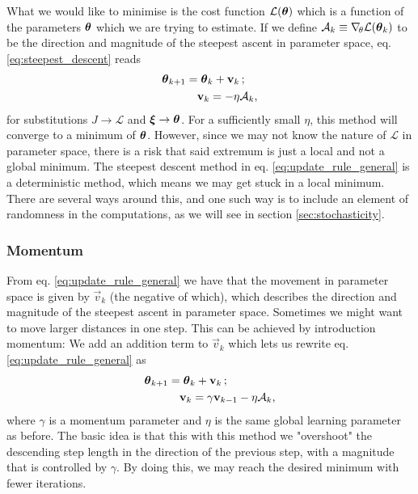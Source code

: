         What we would like to minimise is the cost function $\mathcal{L}(\boldsymbol{\theta})$ which is a function of the parameters $\boldsymbol{\theta}$ which we are trying to estimate. If we define $\mathcal{A}_k \equiv \nabla_{\!\theta} \mathcal{L}(\boldsymbol{\theta}_k)$ to be the direction and magnitude of the steepest ascent in parameter space, eq. \eqref{eq:steepest_descent} reads 
        \begin{equation}\label{eq:update_rule_general}
            \begin{split}
                \boldsymbol{\theta}_{k+1} &= \boldsymbol{\theta}_k + \mathbf{v}_k\,;  \\
                &\quad \mathbf{v}_k = -\eta\mathcal{A}_k,
            \end{split}
        \end{equation}
        for substitutions $J\to\mathcal{L}$ and $\boldsymbol{\xi}\to \boldsymbol{\theta}$. For a sufficiently small $\eta$, this method will converge to a minimum of $\boldsymbol{\theta}$. However, since we may not know the nature of $\mathcal{L}$ in parameter space, there is a risk that said extremum is just a local and not a global minimum. The steepest descent method in eq. \eqref{eq:update_rule_general} is a deterministic method, which means we may get stuck in a local minimum. There are several ways around this, and one such way is to include an element of randomness in the computations, as we will see in section \ref{sec:stochasticity}.

    \subsubsection{Momentum}\label{sec:momentum}
        From eq. \eqref{eq:update_rule_general} we have that the movement in parameter space is given by $\vec{v}_k$ (the negative of which), which describes the direction and magnitude of the steepest ascent in parameter space. Sometimes we might want to move larger distances in one step. This can be achieved by introduction momentum: We add an addition term to $\vec{v}_k$ which lets us rewrite eq. \eqref{eq:update_rule_general} as
        \begin{equation}\label{eq:momentum_GD_algorithm}
            \begin{split}
                \boldsymbol{\theta}_{k+1} &= \boldsymbol{\theta}_k + \mathbf{v}_k\, ; \\
                &\quad \mathbf{v}_k =\gamma\mathbf{v}_{k-1} - \eta\mathcal{A}_k,
            \end{split}
        \end{equation}
        where $\gamma$ is a momentum parameter and $\eta$ is the same global learning parameter as before. The basic idea is that this with this method we "overshoot" the descending step length in the direction of the previous step, with a magnitude that is controlled by $\gamma$. By doing this, we may reach the desired minimum with fewer iterations. 

